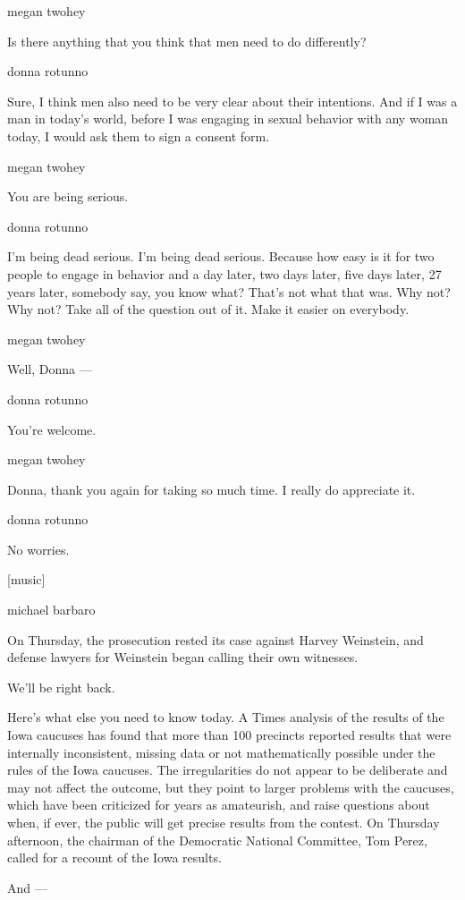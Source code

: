 megan twohey

Is there anything that you think that men need to do differently?

donna rotunno

Sure, I think men also need to be very clear about their intentions. And
if I was a man in today's world, before I was engaging in sexual
behavior with any woman today, I would ask them to sign a consent form.

megan twohey

You are being serious.

donna rotunno

I'm being dead serious. I'm being dead serious. Because how easy is it
for two people to engage in behavior and a day later, two days later,
five days later, 27 years later, somebody say, you know what? That's not
what that was. Why not? Why not? Take all of the question out of it.
Make it easier on everybody.

megan twohey

Well, Donna ---

donna rotunno

You're welcome.

megan twohey

Donna, thank you again for taking so much time. I really do appreciate
it.

donna rotunno

No worries.

{[}music{]}

michael barbaro

On Thursday, the prosecution rested its case against Harvey Weinstein,
and defense lawyers for Weinstein began calling their own witnesses.

We'll be right back.

Here's what else you need to know today. A Times analysis of the results
of the Iowa caucuses has found that more than 100 precincts reported
results that were internally inconsistent, missing data or not
mathematically possible under the rules of the Iowa caucuses. The
irregularities do not appear to be deliberate and may not affect the
outcome, but they point to larger problems with the caucuses, which have
been criticized for years as amateurish, and raise questions about when,
if ever, the public will get precise results from the contest. On
Thursday afternoon, the chairman of the Democratic National Committee,
Tom Perez, called for a recount of the Iowa results.

And ---

